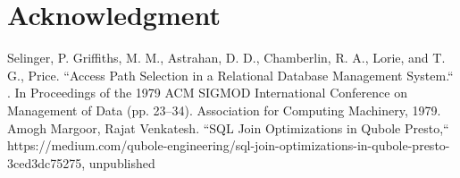 \documentclass[conference]{IEEEtran}
\begin{document}








\section*{Acknowledgment}

\begin{thebibliography}{00}
 Selinger, P. Griffiths, M. M., Astrahan, D. D., Chamberlin, R. A., Lorie, and T. G., Price. ``Access Path Selection in a Relational Database Management System.`` . In Proceedings of the 1979 ACM SIGMOD International Conference on Management of Data (pp. 23–34). Association for Computing Machinery, 1979.
 Amogh Margoor, Rajat Venkatesh. ``SQL Join Optimizations in Qubole Presto,``
https://medium.com/qubole-engineering/sql-join-optimizations-in-qubole-presto-3ced3dc75275, unpublished 
\end{thebibliography}
\end{document}
